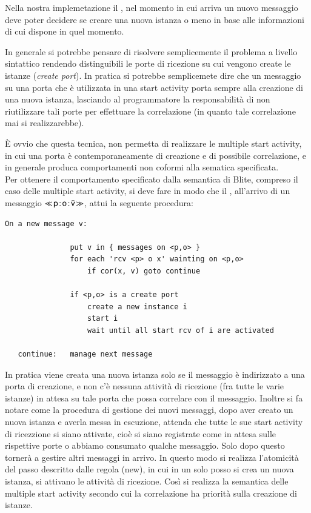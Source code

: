 Nella nostra implemetazione il , nel momento in cui arriva
un nuovo messaggio deve poter decidere se creare una nuova istanza o meno in
base alle informazioni di cui dispone in quel momento.

In generale si potrebbe pensare di risolvere semplicemente il problema a livello
sintattico rendendo distinguibili le porte di
ricezione su cui vengono create le istanze (\emph{create port}). In pratica si
potrebbe semplicemete dire che un messaggio su una porta che è utilizzata in
una start activity porta sempre alla creazione di una nuova istanza, lasciando
al programmatore la responsabilità di non riutilizzare tali porte per
effettuare la correlazione (in quanto tale correlazione mai si realizzarebbe).

\`E ovvio che questa tecnica, non permetta di realizzare le multiple
start activity, in cui una porta è contemporaneamente di creazione e di possibile
correlazione, e in generale produca comportamenti non coformi alla sematica
specificata.
\\

Per ottenere il comportamento specificato dalla semantica di
Blite, compreso il caso delle multiple start activity, si deve fare in modo
che il , all'arrivo di un messaggio
$\ll\!{{\sf p}}\! : \! {\sf o}\! : \! \bar{{\sf v}}\!\gg$,  attui la seguente procedura:
\begin{verbatim}
On a new message v:

               put v in { messages on <p,o> } 
               for each 'rcv <p> o x' wainting on <p,o>
                   if cor(x, v) goto continue

               if <p,o> is a create port 
                   create a new instance i
                   start i
                   wait until all start rcv of i are activated
               
   continue:   manage next message 
\end{verbatim}

In pratica viene creata una nuova istanza solo se il messaggio è indirizzato
a una porta di creazione, e non c'è nessuna attività di
ricezione (fra tutte le varie istanze) in attesa su tale porta che possa
correlare con il messaggio. Inoltre si fa notare come la procedura di gestione
dei nuovi messaggi, dopo aver creato un nuova istanza e averla messa in
escuzione, attenda che tutte le sue start activity di ricezzione si siano
attivate, cioè si siano registrate come in attesa sulle rispettive porte o
abbiamo consumato qualche messaggio. Solo dopo questo tornerà a gestire altri
messaggi in arrivo. In questo modo si realizza l'atomicità del passo descritto dalle regola (new),
in cui in un solo posso si crea un nuova istanza, si attivano le attività di
ricezione. Così si realizza la semantica delle multiple start activity secondo
cui la correlazione ha priorità sulla creazione di istanze.

